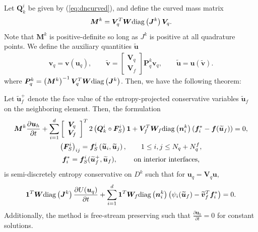 \documentclass{svjour3}                     %
\renewcommand{\tilde}{\widetilde}
\newcommand{\diag}[1]{{\rm diag}\LRp{#1}}
\newcommand{\pd}[2]{\frac{\partial#1}{\partial#2}}
\newcommand{\LRp}[1]{\left( #1 \right)}
\newcommand{\LRs}[1]{\left[ #1 \right]}
\newcommand{\bnote}[1]{{\color{blue}{#1}}}
\begin{document}
Let $\bm{Q}^i_k$ be given by (\ref{eq:dncurved}), and define the curved mass matrix 
\[
\bm{M}^k = \bm{V}_q^T\bm{W}\diag{\bm{J}^k}\bm{V}_q.
\]
Note that $\bm{M}^k$ is positive-definite so long as $J^k$ is positive at all quadrature points.  We define the auxiliary quantities $\tilde{\bm{u}}$ 
\begin{gather*}
\bm{v}_q = \bm{v}\LRp{\bm{u}_q}, \qquad \tilde{\bm{v}} = \begin{bmatrix}
\bm{V}_q\\
\bm{V}_f
\end{bmatrix}\bm{P}^k_q\bm{v}_q, \qquad \tilde{\bm{u}} = \bm{u}\LRp{\tilde{\bm{v}}}.
\end{gather*}
where $\bm{P}^k_q = \LRp{\bm{M}^k}^{-1}\bm{V}_q^T\bm{W}\diag{\bm{J}^k}$.  Then, we have the following theorem:
\begin{theorem}
\label{thm:skewformcurved}
\bnote{Assume that $\bm{Q}^i_k\bm{1}=\bm{0}$.}
Let $\tilde{\bm{u}}_f^+$ denote the face value of the entropy-projected conservative variables $\tilde{\bm{u}}_f$ on the neighboring element.  Then, the formulation
\begin{gather}
\bm{M}^k\pd{\bm{u}_h}{t} + 
\sum_{i=1}^d \LRs{\begin{array}{cc}
\bm{V}_q \\
\bm{V}_f\end{array}}^T 2\LRp{\bm{Q}^i_k \circ \bm{F}^i_S}\bm{1} + \bm{V}_f^T \bm{W}_f \diag{\bm{n}^k_i}\LRp{\bm{f}_i^*-\bm{f}(\tilde{\bm{u}}_f)} = 0,
\label{eq:skewformcurved}\\
\LRp{\bm{F}^i_S}_{ij} = \bm{f}^i_S\LRp{\tilde{\bm{u}}_i,\tilde{\bm{u}}_j}, \qquad 1\leq i,j\leq N_q + N^f_q, \nonumber\\
\bm{f}_i^* = \bm{f}^i_S(\tilde{\bm{u}}_f^+,\tilde{\bm{u}}_f), \qquad \text{ on interior interfaces,} \nonumber
\end{gather}
is semi-discretely entropy conservative on $D^k$ such that for $\bm{u}_q = \bm{V}_q\bm{u}$,
\begin{gather*}
\bm{1}^T\bm{W}\diag{\bm{J}^k}\pd{U(\bm{u}_q)}{t} + \sum_{i=1}^d\bm{1}^T\bm{W}_f \diag{\bm{n}^k_i} \LRp{\psi_i(\tilde{\bm{u}}_f) - \tilde{\bm{v}}_f^T\bm{f}_i^*} = 0.
\end{gather*}
Additionally, the method is free-stream preserving such that $\pd{\bm{u}_h}{t} = 0$ for constant solutions.
\label{thm:esdgCurved}
\end{theorem}
\end{document}
